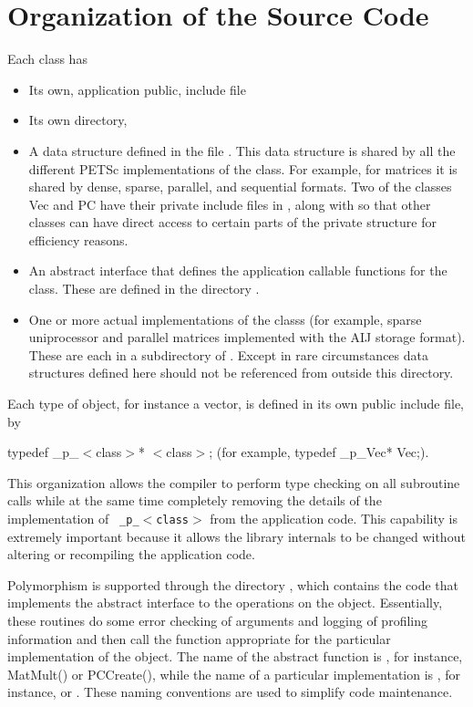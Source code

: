 \documentclass[twoside,12pt]{../sty/report_petsc}
\begin{document}
\section{Organization of the Source Code}

Each class has
\begin{itemize}
\item Its own, application public, include file  
\item Its own directory, 
\item A data structure defined in  the file
      .
      This data structure is shared by all the different PETSc implementations of the 
      class. For example, for matrices it is shared by dense,
      sparse, parallel, and sequential formats.
      Two of the classes Vec and PC have their
      private include files in , along
      with  so that other classes can have direct access to 
      certain parts of the private structure for efficiency reasons.
\item An abstract interface that defines the application callable 
      functions for the class. These are defined in the directory
      .
\item One or more actual implementations of the classs (for example,
      sparse uniprocessor and parallel matrices implemented with the AIJ storage format).
      These are each in a subdirectory of 
      \break {}. Except in rare
      circumstances data 
      structures defined here should not be referenced from outside this 
      directory.
\end{itemize}

Each type of object, for instance a vector, is defined in its own
public include file, by 
\begin{tabbing}
   typedef \_p\_$<$class$>$* $<$class$>$; (for example, typedef \_p\_Vec* Vec;).
\end{tabbing}
  This organization
allows the compiler to perform type checking on all subroutine calls
while at the same time
completely removing the details of the implementation of {\tt
\_p\_$<$class$>$} from the application code.  This capability is extremely important
because it allows the library internals to be changed
without altering or recompiling the application code.

Polymorphism is supported through the directory 
,
which contains the code that implements the abstract interface to the
operations on the object.  Essentially, these routines do some error
checking of arguments and logging of profiling information 
and then call the function appropriate for the
particular implementation of the object. The name of the abstract
function is , for instance, MatMult() or PCCreate(), while
the name of a particular implementation is 
, for instance, 
 or . These naming
conventions are used to simplify code maintenance.
\end{document}
